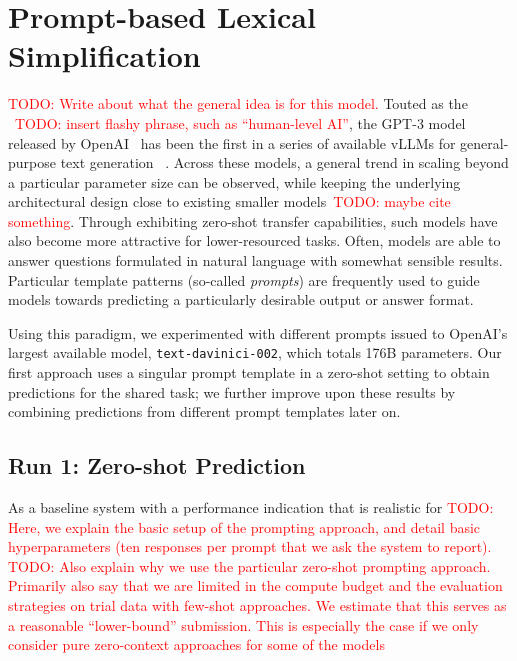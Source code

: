 \documentclass[11pt]{article}
\newcommand{\todo}[1]{\textcolor{red}{TODO: #1}}
\begin{document}
\section{Prompt-based Lexical Simplification}
\todo{Write about what the general idea is for this model.}
Touted as the ~\todo{insert flashy phrase, such as ``human-level AI''}, the GPT-3 model released by OpenAI~\cite{brown-etal-2020-language} has been the first in a series of available vLLMs for general-purpose text generation~ \cite{thoppilan-etal-2022-lambda,bigscience-2022-bloom,zhang-etal-2022-opt}. Across these models, a general trend in scaling beyond a particular parameter size can be observed, while keeping the underlying architectural design close to existing smaller models~\todo{maybe cite something}.
Through exhibiting zero-shot transfer capabilities, such models have also become more attractive for lower-resourced tasks. Often, models are able to answer questions formulated in natural language with somewhat sensible results. Particular template patterns (so-called \emph{prompts}) are frequently used to guide models towards predicting a particularly desirable output or answer format.

\noindent Using this paradigm, we experimented with different prompts issued to OpenAI's largest available model, \texttt{text-davinici-002}, which totals 176B parameters.
Our first approach uses a singular prompt template in a zero-shot setting to obtain predictions for the shared task; we further improve upon these results by combining predictions from different prompt templates later on.

\subsection{Run 1: Zero-shot Prediction}
As a baseline system with a performance indication that is realistic for 
\todo{Here, we explain the basic setup of the prompting approach, and detail basic hyperparameters (ten responses per prompt that we ask the system to report).}
\todo{Also explain why we use the particular zero-shot prompting approach. Primarily also say that we are limited in the compute budget and the evaluation strategies on trial data with few-shot approaches. We estimate that this serves as a reasonable ``lower-bound'' submission. This is especially the case if we only consider pure zero-context approaches for some of the models}
\end{document}
